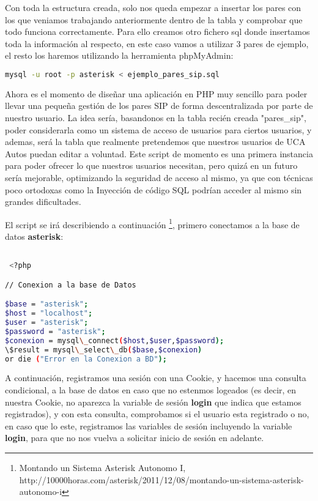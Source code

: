 Con toda la estructura creada, solo nos queda empezar a insertar los pares con los que veniamos trabajando anteriormente dentro de la tabla y comprobar que todo funciona correctamente. Para ello creamos otro fichero sql donde insertamos toda la información al respecto, en este caso vamos a utilizar 3 pares de ejemplo, el resto los haremos utilizando la herramienta phpMyAdmin:



\begin{lstlisting}[language=sh]
mysql -u root -p asterisk < ejemplo_pares_sip.sql
\end{lstlisting}

Ahora es el momento de diseñar una aplicación en PHP muy sencillo para poder llevar una pequeña gestión de los pares SIP de forma descentralizada por parte de nuestro usuario. La idea sería, basandonos en la tabla recién creada "pares\_sip", poder considerarla como un sistema de acceso de usuarios para ciertos usuarios, y ademas, será la tabla que realmente pretendemos que nuestros usuarios de UCA Autos puedan editar a voluntad. Este script de momento es una primera instancia para poder ofrecer lo que nuestros usuarios necesitan, pero quizá en un futuro sería mejorable, optimizando la seguridad de acceso al mismo, ya que con técnicas poco ortodoxas como la Inyección de código SQL podrían acceder al mismo sin grandes dificultades.

El script se irá describiendo a continuación \footnote{Montando un Sistema Asterisk Autonomo I, \\ http://10000horas.com/asterisk/2011/12/08/montando-un-sistema-asterisk-autonomo-i}, primero conectamos a la base de datos \textbf{asterisk}:

\begin{lstlisting}[language=bash,title={./www/usuarios.php}]

 <?php

// Conexion a la base de Datos

$base = "asterisk";
$host = "localhost";
$user = "asterisk";
$password = "asterisk";
$conexion = mysql\_connect($host,$user,$password);
\$result = mysql\_select\_db($base,$conexion) 
or die ("Error en la Conexion a BD");

\end{lstlisting}

A continuación, registramos una sesión con una Cookie, y hacemos una consulta condicional, a la base de datos en caso que no estenmos logeados (es decir, en nuestra Cookie, no aparezca la variable de sesión \textbf{login} que indica que estamos registrados), y con esta consulta, comprobamos si el usuario esta registrado o no, en caso que lo este, registramos las variables de sesión incluyendo la variable \textbf{login}, para que no nos vuelva a solicitar inicio de sesión en adelante.

